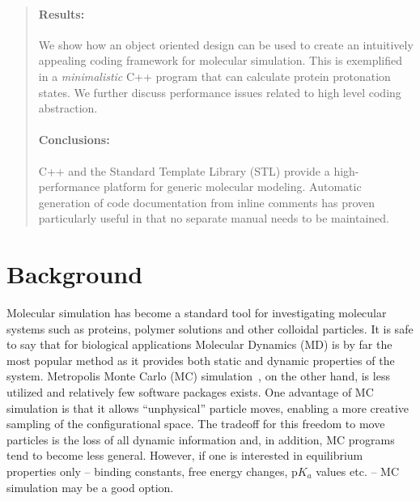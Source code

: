 \documentclass[10pt]{bmc_article}
\newenvironment{bmcformat}{\begin{raggedright}\baselineskip20pt\sloppy\setboolean{publ}{false}}{\end{raggedright}\baselineskip20pt\sloppy}
\begin{document}
\begin{bmcformat}
\begin{abstract}
        \paragraph*{Results:} We show how an object oriented design can be used to create an intuitively appealing coding framework for molecular simulation. This is exemplified in a \emph{minimalistic} C++ program that can calculate protein protonation states. We further discuss performance issues related to high level coding abstraction.

        \paragraph*{Conclusions:} C++ and the Standard Template Library (STL) provide a high-performance platform for generic molecular modeling.
        Automatic generation of code documentation from inline comments has proven particularly useful in that no separate manual needs to be maintained.
\end{abstract}


\section*{Background}
Molecular simulation has become a standard tool for investigating molecular systems such as proteins, polymer solutions and other colloidal particles.
It is safe to say that for biological applications Molecular Dynamics (MD) is by far the most popular method as it provides both static and dynamic properties of the system.
Metropolis Monte Carlo (MC) simulation~\cite{metropolis:53}, on the other hand, is less utilized and relatively few software packages exists\cite{Kamberaj:2001fk,carlsson:01,Jie-Hu:2006lr}.
One advantage of MC simulation is that it allows ``unphysical'' particle moves, enabling a more creative sampling of the configurational space\cite{frenkel}.
The tradeoff for this freedom to move particles is the loss of all dynamic information and, in addition, MC programs tend to become less general.
However, if one is interested in equilibrium properties only -- binding constants, free energy changes, p$K_a$ values etc. -- MC simulation may be a good option.


\end{bmcformat}
\end{document}
